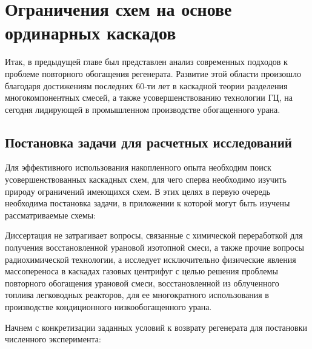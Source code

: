 \chapter{Ограничения схем на основе ординарных каскадов}\label{ch:ch2}

Итак, в предыдущей главе был представлен анализ современных подходов к проблеме повторного обогащения регенерата.
Развитие этой области произошло благодаря достижениям последних 60-ти лет в каскадной теории разделения многокомпонентных смесей, а также усовершенствованию технологии ГЦ, на сегодня лидирующей в промышленном производстве обогащенного урана.

\section{Постановка задачи для расчетных исследований}

Для эффективного использования накопленного опыта необходим поиск усовершенствованных каскадных схем, для чего сперва необходимо изучить природу ограничений имеющихся схем. В этих целях в первую очередь необходима постановка задачи, в приложении к которой могут быть изучены рассматриваемые схемы:


Диссертация не затрагивает вопросы, связанные с химической переработкой для получения восстановленной урановой изотопной смеси, а также прочие вопросы радиохимической технологии, а исследует исключительно физические явления массопереноса в каскадах газовых центрифуг с целью решения проблемы повторного обогащения урановой смеси, восстановленной из облученного топлива легководных реакторов, для ее многократного использования в производстве кондиционного низкообогащенного урана. 

Начнем с конкретизации заданных условий к возврату регенерата для постановки численного эксперимента:

